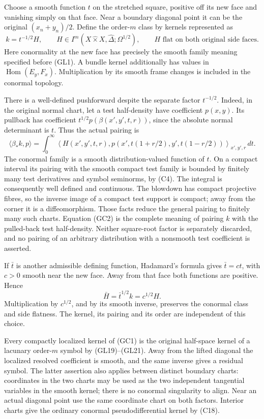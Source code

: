 \documentclass[
  11pt,
]{article}
\begin{document}
Choose a smooth function \(t\) on the stretched square, positive off its
new face and vanishing simply on that face. Near a boundary diagonal
point it can be the original \((x_n+y_n)/2\). Define the order-\(m\)
class by kernels represented as \[
 k=t^{-1/2}H,\qquad
 H\in I^m(X\widehat\times X,\widehat\Delta;\Omega^{1/2}),
 \qquad H\text{ flat on both original side faces}.
 \tag{GC1}
\] Here conormality at the new face has precisely the smooth family
meaning specified before (GL1). A bundle kernel additionally has values
in \(\operatorname{Hom}(E_y,F_x)\). Multiplication by its smooth frame
changes is included in the conormal topology.

There is a well-defined pushforward despite the separate factor
\(t^{-1/2}\). Indeed, in the original normal chart, let a test
half-density have coefficient \(p(x,y)\). Its pullback has coefficient
\(t^{1/2}p(\beta(x',y',t,r))\), since the absolute normal determinant is
\(t\). Thus the actual pairing is \[
 \langle\beta_*k,p\rangle
 =\int_0^\infty
   \left\langle H(x',y',t,r),
       p(x',t(1+r/2),y',t(1-r/2))\right\rangle_{x',y',r}\,dt.
 \tag{GC2}
\] The conormal family is a smooth distribution-valued function of
\(t\). On a compact interval its pairing with the smooth compact test
family is bounded by finitely many test derivatives and symbol
seminorms, by (C4). The integral is consequently well defined and
continuous. The blowdown has compact projective fibres, so the inverse
image of a compact test support is compact; away from the corner it is a
diffeomorphism. Those facts reduce the general pairing to finitely many
such charts. Equation (GC2) is the complete meaning of pairing \(k\)
with the pulled-back test half-density. Neither square-root factor is
separately discarded, and no pairing of an arbitrary distribution with a
nonsmooth test coefficient is asserted.

If \(\bar t\) is another admissible defining function, Hadamard's
formula gives \(\bar t=c t\), with \(c>0\) smooth near the new face.
Away from that face both functions are positive. Hence \[
 \bar H=\bar t^{1/2}k=c^{1/2}H.
 \tag{GC3}
\] Multiplication by \(c^{1/2}\), and by its smooth inverse, preserves
the conormal class and side flatness. The kernel, its pairing and its
order are independent of this choice.

Every compactly localized kernel of (GC1) is the original half-space
kernel of a lacunary order-\(m\) symbol by (GL19)--(GL21). Away from the
lifted diagonal the localized resolved coefficient is smooth, and the
same inverse gives a residual symbol. The latter assertion also applies
between distinct boundary charts: coordinates in the two charts may be
used as the two independent tangential variables in the smooth kernel;
there is no conormal singularity to align. Near an actual diagonal point
use the same coordinate chart on both factors. Interior charts give the
ordinary conormal pseudodifferential kernel by (C18).
\end{document}
